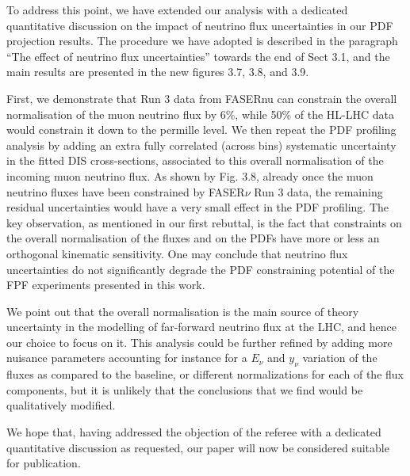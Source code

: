 \documentclass[11pt,a4paper]{article}
\begin{document}
To address this point, we have extended our analysis with a dedicated quantitative discussion on the impact of neutrino flux uncertainties in our PDF projection results.
%
The procedure we have adopted is described in the paragraph ``The effect of neutrino flux uncertainties'' towards the end of Sect 3.1, and the main results are presented in the new figures 3.7, 3.8, and 3.9.

First, we demonstrate that Run 3 data from FASERnu can constrain the overall normalisation of the muon neutrino flux by 6\%, while 50\% of the HL-LHC data would constrain it down to the permille level.
%
We then repeat the PDF profiling analysis by adding an extra fully correlated (across bins) systematic uncertainty in the fitted DIS cross-sections, associated to this overall normalisation of the incoming muon neutrino flux.
%
As shown by Fig. 3.8, already once the muon neutrino fluxes have been constrained by FASER$\nu$ Run 3 data, the remaining residual uncertainties would have a very small effect in the PDF profiling.
%
The key observation, as mentioned in our first rebuttal, is the fact that constraints on the overall normalisation of the fluxes and on the PDFs have more or less an orthogonal kinematic sensitivity.
%
One may conclude that neutrino flux uncertainties do not significantly degrade the PDF constraining potential of the FPF experiments presented in this work.

We point out that the overall normalisation is the main source of theory uncertainty in the modelling of far-forward neutrino flux at the LHC, and hence our choice to focus on it.
%
This analysis could be further refined by adding more nuisance parameters accounting for instance for a $E_\nu$ and $y_\nu$ variation of the fluxes as compared to the baseline, or different normalizations for each of the flux components, but it is unlikely that the conclusions that we find would be qualitatively modified.
%


We hope that, having addressed the objection of the referee with a dedicated quantitative discussion as requested, our paper will now be considered suitable for publication.




\end{document}
